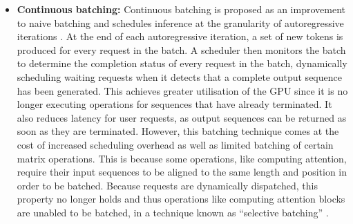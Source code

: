 \documentclass[12pt,twoside]{report}
\begin{document}
\begin{itemize}
  \item \textbf{Continuous batching:} Continuous batching is proposed as an improvement to naive batching and schedules inference at the granularity of autoregressive iterations \cite{yu2022orca}.
    At the end of each autoregressive iteration, a set of new tokens is produced for every request in the batch.    
    A scheduler then monitors the batch to determine the completion status of every request in the batch, dynamically scheduling waiting requests when it detects that a complete output sequence has been generated.
    This achieves greater utilisation of the GPU since it is no longer executing operations for sequences that have already terminated.
    It also reduces latency for user requests, as output sequences can be returned as soon as they are terminated.
    However, this batching technique comes at the cost of increased scheduling overhead as well as limited batching of certain matrix operations.
    This is because some operations, like computing attention, require their input sequences to be aligned to the same length and position in order to be batched.
    Because requests are dynamically dispatched, this property no longer holds and thus operations like computing attention blocks are unabled to be batched, in a technique known as ``selective batching'' \cite{yu2022orca}.
\end{itemize}


\begin{comment}
\subsubsection{Kernel Specialisation}

\subsubsection{Sampling Strategy}\label{subsubsection:samplingstrategy}

\subsubsection{Quantization}
\end{comment}
\end{document}
